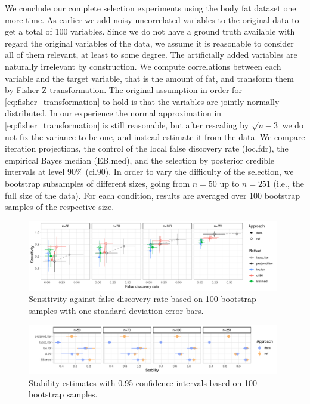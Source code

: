 \documentclass[a4]{article}
\theoremstyle{definition}
\begin{document}
We conclude our complete selection experiments using the body fat
dataset one more time. As earlier we add noisy uncorrelated variables
to the original data to get a total of 100 variables.
Since we do not have a ground truth available with regard the original
variables of the data, we assume it is reasonable to consider all of
them relevant, at least to some degree. The artificially added
variables are naturally irrelevant by construction.
We compute
correlations between each variable and the target variable, that is
the amount of fat, and transform them by Fisher-Z-transformation. The
original assumption in order for \eqref{eq:fisher_transformation} to
hold is that the variables are jointly normally distributed. In our
experience the normal approximation in
\eqref{eq:fisher_transformation} is still reasonable, but after
rescaling by $\sqrt{n-3}$ we do not fix the variance to be one, and
instead estimate it from the data. We compare iteration projections, 
the control of the local false discovery rate (loc.fdr), 
the empirical Bayes median (EB.med),
and the selection by posterior credible intervals at level 90\%
(ci.90).  In order to vary the difficulty of the selection, we
bootstrap subsamples of different sizes, going from $n=50$ up to
$n=251$ (i.e., the full size of the data). For each condition, results
are averaged over 100 bootstrap samples of the respective size.

\begin{figure}[tp]
  \centering
  \includegraphics[width=0.98\textwidth]{graphics/bodyfat_sensitivity_vs_fdr.pdf}
  \caption{Sensitivity against false discovery rate based on 100 bootstrap samples with one standard deviation error bars.\\}
  \label{fig:bodyfat_sensitivity_vs_fdr}
\end{figure}

\begin{figure}[tp]
  \centering
  \includegraphics[width=0.98\textwidth]{graphics/bodyfat_stability.pdf}
  \caption{Stability estimates with 0.95 confidence intervals based on 100 bootstrap samples.\\}
  \label{fig:bodyfat_stability}
\end{figure}
\end{document}
